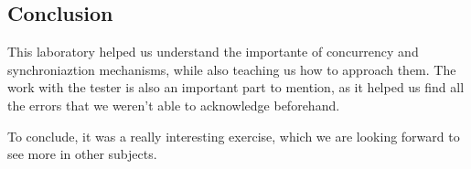 \documentclass[es]{uc3mreport}
\begin{document}
\begin{report}
      \part{Conclusion}

      \setcounter{section}{0}

      \setcounter{subsection}{0}

      \setcounter{subsubsection}{0}

      This laboratory helped us understand the importante of concurrency
      and synchroniaztion mechanisms, while also teaching us how to
      approach them. The work with the tester is also an important part
      to mention, as it helped us find all the errors that we weren't
      able to acknowledge beforehand.

      To conclude, it was a really interesting exercise, which we are
      looking forward to see more in other subjects.

    \end{report}

    
    
\end{document}
